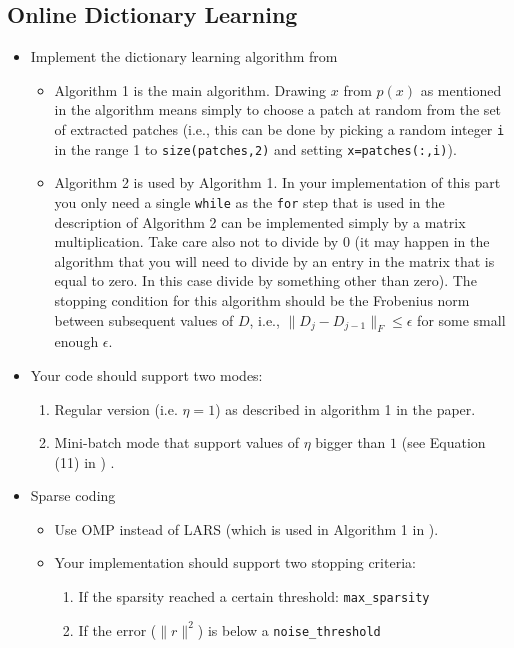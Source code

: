 \documentclass[]{article}
\begin{document}
		\subsection{Online Dictionary Learning}
		\begin{itemize}
			\item Implement the dictionary learning algorithm from \cite{mairal2009online}
			\begin{itemize}
				\item Algorithm 1 is the main algorithm. Drawing $x$ from $p(x)$ as mentioned in the algorithm means simply to choose a patch at random from the set of extracted patches (i.e., this can be done by picking a random integer \lstinline|i| in the range 1 to \lstinline|size(patches,2)| and setting \lstinline|x=patches(:,i)|). 
				\item Algorithm 2 is used by Algorithm 1. In your implementation of this part you only need a single \lstinline|while| as the \lstinline|for| step that is used in the description of Algorithm 2  can be implemented simply by a matrix multiplication. Take care also not to divide by 0 (it may happen in the algorithm that you will need to divide by an entry in the matrix that is equal to zero. In this case divide by something other than zero). The stopping condition for this algorithm should be the Frobenius norm between subsequent values of $D$, i.e., $\|D_{j}-D_{j-1}\|_{F}\leq \epsilon$ for some small enough $\epsilon$.    
			\end{itemize}
			\item Your code should support two modes:
			\begin{enumerate}
				\item Regular version (i.e. $\eta = 1$) as described in algorithm 1 in the paper. 
				\item Mini-batch mode that support values of $\eta$ bigger than $1$ (see Equation (11) in \cite{mairal2009online}) .   
			\end{enumerate}
			\item Sparse coding 
			\begin{itemize}
				\item Use OMP instead of LARS (which is used in Algorithm 1 in \cite{mairal2009online}).  
				\item Your implementation should support two stopping criteria: 
				\begin{enumerate}
					\item If the sparsity reached a certain threshold: \lstinline|max_sparsity|
					\item If the error ($\|r\|^2$) is below a \lstinline|noise_threshold|  
					

\end{enumerate}
\end{itemize}
\end{itemize}
\end{document}
